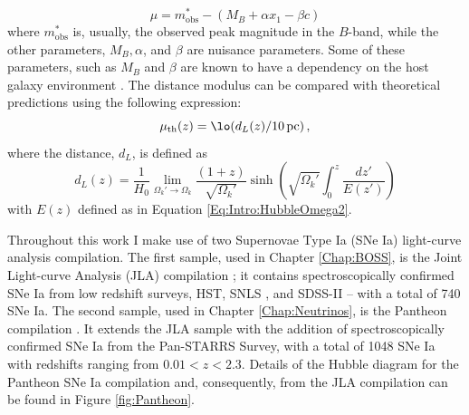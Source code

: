 \begin{equation}
    \mu = m_{\text{obs}}^* - (M_B + \alpha x_1 - \beta c)
\end{equation}
where $m_{\text{obs}}^*$ is, usually, the observed peak magnitude in the $B$-band, while the other parameters, $M_B, \alpha$, and $\beta$ are nuisance parameters. Some of these parameters, such as $M_B$ and $\beta$ are known to have a dependency on the host galaxy environment \citep{2011Sullivan}. The distance modulus can be compared with theoretical predictions using the following expression:
\begin{equation}
    \mu_{\text{th}}(z) = \lo(d_L(z)/10\, \text{pc})\, ,
\end{equation}
where the distance, $d_L$, is defined as 
\begin{equation}
    d_L(z) = \frac{1}{H_0}\lim_{\Omega_k' \rightarrow \Omega_k}\frac{(1+z)}{\sqrt{\Omega_k'}}\sinh\left( \sqrt{\Omega_k'}\int_0^z\frac{dz'}{E(z')}\right)
\end{equation}
with $E(z)$ defined as in Equation \eqref{Eq:Intro:HubbleOmega2}.

\qquad Throughout this work I make use of two Supernovae Type Ia (SNe Ia) light-curve analysis compilation. The first sample, used in Chapter \ref{Chap:BOSS}, is the Joint Light-curve Analysis (JLA) compilation \citep{JLAdata}; it contains spectroscopically confirmed SNe Ia from low redshift surveys, HST, SNLS \citep[all three presented in ]{2011Conley}, and SDSS-II \citep{2018Sako} -- with a total of 740 SNe Ia. The second sample, used in Chapter \ref{Chap:Neutrinos}, is the Pantheon compilation \citep{2018Pantheon}. It extends the JLA sample with the addition of spectroscopically confirmed SNe Ia from the Pan-STARRS Survey, with a total of 1048 SNe Ia with redshifts ranging from $0.01 < z < 2.3$. Details of the Hubble diagram for the Pantheon SNe Ia compilation and, consequently, from the JLA compilation can be found in Figure \ref{fig:Pantheon}.



